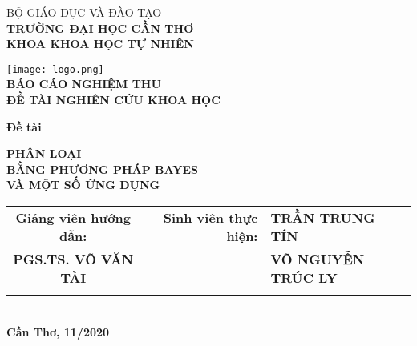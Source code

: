 \documentclass[../thesis.tex]{subfiles}
\begin{document}
\begin{titlepage}

\begin{center}

BỘ GIÁO DỤC VÀ ĐÀO TẠO\\
\textbf{TRƯỜNG ĐẠI HỌC CẦN THƠ\\}
\textbf{KHOA KHOA HỌC TỰ NHIÊN\\[1cm]}

\texttt{[image: logo.png]}\\[1cm]

\textbf{BÁO CÁO NGHIỆM THU\\}
\textbf{ĐỀ TÀI NGHIÊN CỨU KHOA HỌC\\[2cm]}

\begin{large}
\textbf{Đề tài\\[0.5cm]}
\end{large}
\textbf{\LARGE PHÂN LOẠI\\ BẰNG PHƯƠNG PHÁP BAYES \\ VÀ MỘT SỐ ỨNG DỤNG }
\\[3cm]

\begin{tabular}{ c c r l }
 \textbf{Giảng viên hướng dẫn:} & & \textbf{Sinh viên thực hiện:} & \textbf{TRẦN TRUNG TÍN}\\ 
 \textbf{PGS.TS. VÕ VĂN TÀI} & & \textbf{ } & \textbf{VÕ NGUYỄN TRÚC LY}\\  
 & &%
\end{tabular}
\\[3cm]

\textbf{Cần Thơ, 11/2020}

\end{center}

\end{titlepage}
\end{document}
